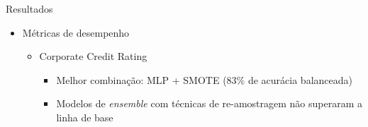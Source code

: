 \begin{frame}{Resultados}

  \begin{itemize}
    \item[$\blacktriangleright$] Métricas de desempenho
      \begin{itemize}
        \item Corporate Credit Rating
          \begin{itemize}
            \item[$\checkmark$] Melhor combinação: MLP + SMOTE ($83\%$ de acurácia balanceada)
            \item[$\checkmark$] Modelos de \textit{ensemble} com técnicas de re-amostragem não superaram a linha de base
          \end{itemize}
      \end{itemize}
  \end{itemize}

  \scriptsize
  \setlength{\tabcolsep}{2pt}
  \renewcommand{\arraystretch}{1.05}


\end{frame}
